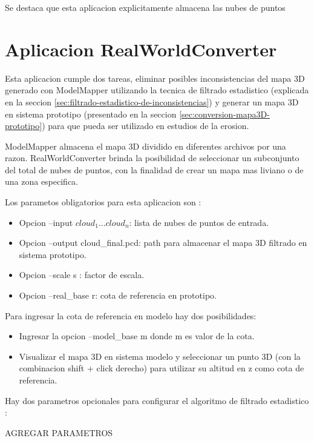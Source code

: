 Se destaca que esta aplicacion explicitamente almacena las nubes de puntos 

\section{Aplicacion RealWorldConverter}
 
Esta aplicacion cumple dos tareas, eliminar posibles inconsistencias del mapa 3D generado con ModelMapper utilizando la tecnica de filtrado estadistico (explicada en la seccion \ref{sec:filtrado-estadistico-de-inconsistencias}) y generar un mapa 3D en sistema prototipo (presentado en la seccion \ref{sec:conversion-mapa3D-prototipo}) para que pueda ser utilizado en estudios de la erosion.

ModelMapper almacena el mapa 3D dividido en diferentes archivos por una razon. RealWorldConverter brinda la posibilidad de seleccionar un subconjunto del total de nubes de puntos, con la finalidad de crear un mapa mas liviano o de una zona especifica. 

Los parametos obligatorios para esta aplicacion son :

\begin{itemize}
\item Opcion --input $ cloud_{1} ... cloud_{n} $: lista de nubes de puntos de entrada.

\item Opcion --output cloud\_final.pcd: path para almacenar el mapa 3D filtrado en sistema prototipo.

\item Opcion --scale s : factor de escala.

\item Opcion --real\_base r: cota de referencia en prototipo.

\end{itemize}

Para ingresar la cota de referencia en modelo hay dos posibilidades: 
\begin{itemize}

\item Ingresar la opcion --model\_base m  donde m es valor de la cota.

\item Visualizar el mapa 3D en sistema modelo y seleccionar un punto 3D (con la combinacion shift + click derecho) para utilizar su altitud en z como cota de referencia.

\end{itemize}

Hay dos parametros opcionales para configurar el algoritmo de filtrado estadistico :

AGREGAR PARAMETROS
